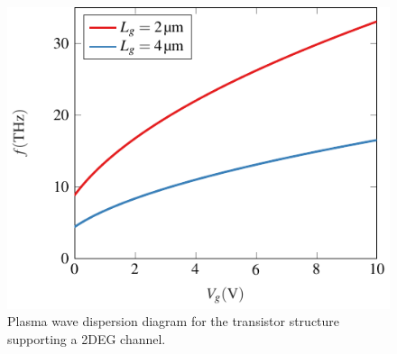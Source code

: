 \documentclass{ieeeaccess}
\renewcommand{\^}{\hat}  %
\begin{document}
\begin{figure}[t!]
  \includegraphics[height=.75\linewidth]{gate_swing.pdf}
  \caption{Plasma wave dispersion diagram for the transistor structure supporting a 2DEG channel.}
  \label{fig:tuning}
\end{figure}
\end{document}

